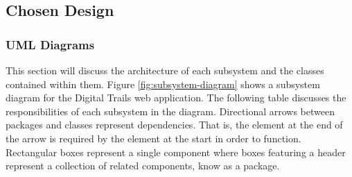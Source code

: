 \documentclass[11pt,a4paper]{report}
\begin{document}
\subsection{Chosen Design}
\label{sec:portal-chosen-design}

\subsubsection{UML Diagrams}

This section will discuss the architecture of each subsystem and the classes contained within them. Figure \ref{fig:subsystem-diagram} shows a subsystem diagram for the Digital Trails web application. The following table discusses the responsibilities of each subsystem in the diagram. Directional arrows between packages and classes represent dependencies. That is, the element at the end of the arrow is required by the element at the start in order to function. Rectangular boxes represent a single component where boxes featuring a header represent a collection of related components, know as a package.
\end{document}
